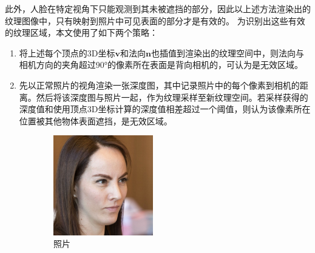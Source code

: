 此外，人脸在特定视角下只能观测到其未被遮挡的部分，因此以上述方法渲染出的纹理图像中，只有映射到照片中可见表面的部分才是有效的。
为识别出这些有效的纹理区域，本文使用了如下两个策略：
\begin{enumerate}
\item 将上述每个顶点的3D坐标$\mathbf{v}$和法向$\mathbf{n}$也插值到渲染出的纹理空间中，则法向与相机方向的夹角超过90°的像素所在表面是背向相机的，可认为是无效区域。
\item 先以正常照片的视角渲染一张深度图，其中记录照片中的每个像素到相机的距离。然后将该深度图与照片一起，作为纹理采样至新纹理空间。若采样获得的深度值和使用顶点3D坐标计算的深度值相差超过一个阈值，则认为该像素所在位置被其他物体表面遮挡，是无效区域。
\end{enumerate}
\begin{figure}
\centering
\begin{subfigure}{4.35cm}
    \includegraphics[width=4.35cm]{figures/diffrast_face/04114/target_hs}
    \caption{照片}
\end{subfigure}%
\begin{subfigure}{5.8cm}
\end{subfigure}
\end{figure}

